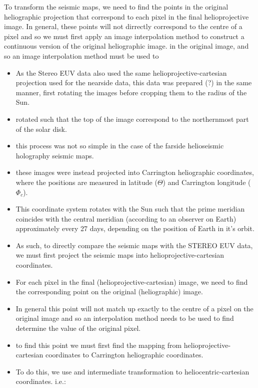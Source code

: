 \documentclass[11pt,a4paper,onecolumn]{report}
\begin{document}
To transform the seismic maps, we need to find the points in the original
heliographic projection that correspond to each pixel in the final
helioprojective image. In general, these points will not dirrectly correspond to
the centre of a pixel and so we must first apply an image interpolation method
to construct a continuous version of the original heliographic image.
in the original image, and so an image interpolation method must be used to



\begin{itemize}
  \item As the Stereo EUV data also used the same helioprojective-cartesian
  projection used for the nearside data, this data was prepared (?) in the same
  manner, first rotating the images before cropping them to the radius of the
  Sun.
  \item rotated such that the top of the image correspond to the northernmost part
  of the solar disk.
  \item this process was not so simple in the case of the farside helioseismic
  holography seismic maps.
  \item these images were instead projected into Carrington heliographic
  coordinates, where the positions are measured in latitude (\(\Theta\)) and
  Carrington longitude (\(\Phi_c\)).
  \item This coordinate system rotates with the Sun such that the prime meridian
  coincides with the central meridian (according to an observer on Earth)
  approximately every 27 days, depending on the position of Earth in it's orbit.
  \item As such, to directly compare the seismic maps with the STEREO EUV
  data, we must first project the seismic maps into helioprojective-cartesian
  coordinates.

  \item For each pixel in the final (helioprojective-cartesian) image, we need
  to find the corresponding point on the original (heliographic) image.
  \item In general this point will not match up exactly to the centre of a pixel
  on the original image and so an interpolation method needs to be used to find
  determine the value of the original pixel.
  \item to find this point we must first find the mapping from
  helioprojective-cartesian coordinates to Carrington heliographic coordinates.
  \item To do this, we use and intermediate transformation to
  heliocentric-cartesian coordinates. i.e.:
\end{itemize}
\end{document}
